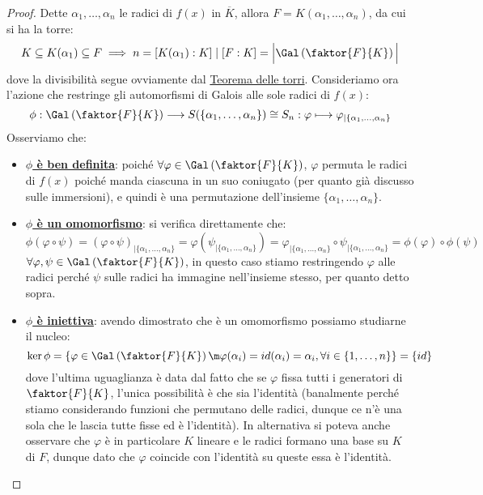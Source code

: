 \documentclass[11pt]{scrartcl}
\begin{document}
\begin{proof}
    Dette $\alpha_1,\ldots,\alpha_n$ le radici di $f(x)$ in $\overline K$, allora $F = K(\alpha_1,\ldots,\alpha_n)$, da cui si ha la torre:
    \[ K \subseteq K(\alpha_1) \subseteq F \implies n = [K(\alpha_1) : K] \mid [F : K] = \Big|\Gal\left(\faktor{F}{K}\right)\Big|
        \]
    dove la divisibilità segue ovviamente dal \hyperref[torri]{Teorema delle torri}. Consideriamo ora l'azione che restringe gli automorfismi di Galois alle sole radici di $f(x)$:
    \[ \phi: \Gal\left(\faktor{F}{K}\right) \longrightarrow S(\{\alpha_1,\ldots,\alpha_n\}) \cong S_n : \varphi \longmapsto \varphi_{|\{\alpha_1,\ldots,\alpha_n\}}
        \]
    Osserviamo che:
    \begin{itemize}
        \item \underline{\textbf{$\phi$ è ben definita}}: poiché $\forall \varphi \in \Gal\left(\faktor{F}{K}\right)$, $\varphi$ permuta le radici di $f(x)$ poiché manda ciascuna in un suo coniugato (per quanto già discusso sulle immersioni), e quindi è una permutazione dell'insieme $\{\alpha_1,\ldots,\alpha_n\}$.
        \item \underline{\textbf{$\phi$ è un omomorfismo}}: si verifica direttamente che:
        \[ \phi(\varphi \circ \psi) = (\varphi \circ \psi)_{|{\{\alpha_1,\ldots,\alpha_n\}}} = \varphi(\psi_{|{\{\alpha_1,\ldots,\alpha_n\}}}) = \varphi_{|{\{\alpha_1,\ldots,\alpha_n\}}} \circ \psi_{|{\{\alpha_1,\ldots,\alpha_n\}}} = \phi(\varphi) \circ \phi(\psi)
            \]
        $\forall \varphi,\psi \in \Gal\left(\faktor{F}{K}\right)$, in questo caso stiamo restringendo $\varphi$ alle radici perché $\psi$ sulle radici ha immagine nell'insieme stesso, per quanto detto sopra.    
        \item \underline{\textbf{$\phi$ è iniettiva}}: avendo dimostrato che è un omomorfismo possiamo studiarne il nucleo:
        \[ \ker \phi = \left\{\varphi \in \Gal\left(\faktor{F}{K}\right) \m \varphi(\alpha_i) = id(\alpha_i) = \alpha_i, \forall i \in \{1,\ldots,n\}\right\} = \{id\}
            \]
        dove l'ultima uguaglianza è data dal fatto che se $\varphi$ fissa tutti i generatori di $\faktor{F}{K}$, l'unica possibilità è che sia l'identità (banalmente perché stiamo considerando funzioni che permutano delle radici,
        dunque ce n'è una sola che le lascia tutte fisse ed è l'identità). In alternativa si poteva anche osservare che $\varphi$ è in particolare $K$ lineare e le radici formano una base su $K$ di $F$, dunque dato che $\varphi$ coincide
        con l'identità su queste essa è l'identità.
    \end{itemize}
\end{proof}
\end{document}
